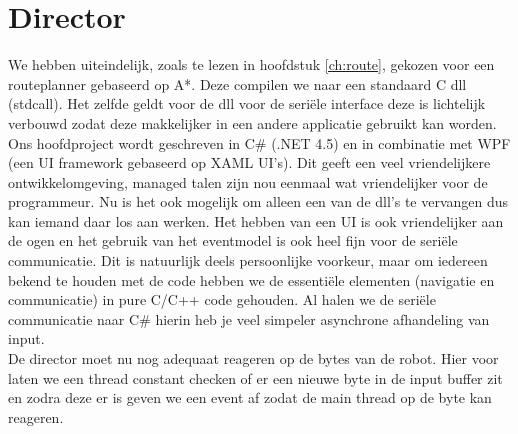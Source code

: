 \documentclass{report}
\begin{document}
\section{Director}
We hebben uiteindelijk, zoals te lezen in hoofdstuk \ref{ch:route}, gekozen voor een routeplanner gebaseerd op A*. Deze compilen we naar een standaard C dll (stdcall).
Het zelfde geldt voor de dll voor de seriële interface deze is lichtelijk verbouwd zodat deze makkelijker in een andere applicatie gebruikt kan worden.
Ons hoofdproject wordt geschreven in C\# (.NET 4.5) en in combinatie met WPF (een UI framework gebaseerd op XAML UI's).
Dit geeft een veel vriendelijkere ontwikkelomgeving, managed talen zijn nou eenmaal wat vriendelijker voor de programmeur.
Nu is het ook mogelijk om alleen een van de dll's te vervangen dus kan iemand daar los aan werken.
Het hebben van een UI is ook vriendelijker aan de ogen en het gebruik van het eventmodel is ook heel fijn voor de seriële communicatie.
Dit is natuurlijk deels persoonlijke voorkeur, maar om iedereen bekend te houden met de code hebben we de essentiële elementen (navigatie en communicatie) in pure C/C++ code gehouden. Al halen we de seriële communicatie naar C\# hierin heb je veel simpeler asynchrone afhandeling van input.\\
De director moet nu nog adequaat reageren op de bytes van de robot.
Hier voor laten we een thread constant checken of er een nieuwe byte in de input buffer zit en zodra deze er is geven we een event af zodat de main thread op de byte kan reageren.
\end{document}
